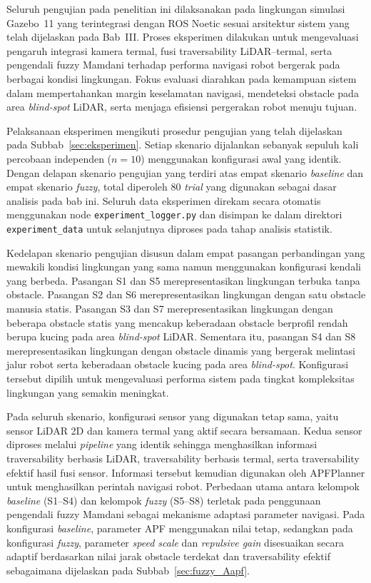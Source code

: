 Seluruh pengujian pada penelitian ini dilaksanakan pada lingkungan simulasi Gazebo~11 yang terintegrasi dengan ROS Noetic sesuai arsitektur sistem yang telah dijelaskan pada Bab~III. Proses eksperimen dilakukan untuk mengevaluasi pengaruh integrasi kamera termal, fusi trav\-ersability LiDAR--termal, serta pengendali fuzzy Mamdani terhadap performa navigasi robot bergerak pada berbagai kondisi lingkungan. Fokus evaluasi diarahkan pada kemampuan sistem dalam mempertahankan margin keselamatan navigasi, mendeteksi obstacle pada area \textit{blind-spot} LiDAR, serta menjaga efisiensi pergerakan robot menuju tujuan.

Pelaksanaan eksperimen mengikuti prosedur pengujian yang telah dijelaskan pada Subbab~\ref{sec:eksperimen}. Setiap skenario dijalankan sebanyak sepuluh kali percobaan independen ($n = 10$) menggunakan konfigurasi awal yang identik. Dengan delapan skenario pengujian yang terdiri atas empat skenario \textit{baseline} dan empat skenario \textit{fuzzy}, total diperoleh 80 \textit{trial} yang digunakan sebagai dasar analisis pada bab ini. Seluruh data eksperimen direkam secara otomatis menggunakan node \texttt{experiment\_logger.py} dan disimpan ke dalam direktori \texttt{experiment\_data} untuk selanjutnya diproses pada tahap analisis statistik.

Kedelapan skenario pengujian disusun dalam empat pasangan perbandingan yang mewakili kondisi lingkungan yang sama namun menggunakan konfigurasi kendali yang berbeda. Pas\-angan S1 dan S5 merepresentasikan lingkungan terbuka tanpa obstacle. Pasangan S2 dan S6 merepresentasikan lingkungan dengan satu obstacle manusia statis. Pasangan S3 dan S7 merepresentasikan lingkungan dengan beberapa obstacle statis yang mencakup keberadaan obstacle berprofil rendah berupa kucing pada area \textit{blind-spot} LiDAR. Sementara itu, pasangan S4 dan S8 merepresentasikan lingkungan dengan obstacle dinamis yang bergerak melintasi jalur robot serta keberadaan obstacle kucing pada area \textit{blind-spot}. Konfigurasi tersebut dipilih untuk mengevaluasi performa sistem pada tingkat kompleksitas lingkungan yang semakin meningkat.

Pada seluruh skenario, konfigurasi sensor yang digunakan tetap sama, yaitu sensor LiDAR 2D dan kamera termal yang aktif secara bersamaan. Kedua sensor diproses melalui \textit{pipeline} yang identik sehingga menghasilkan informasi traversability berbasis LiDAR, traversability berbasis termal, serta traversability efektif hasil fusi sensor. Informasi tersebut kemudian digunakan oleh APFPlanner untuk menghasilkan perintah navigasi robot. Perbedaan utama antara kelompok \textit{baseline} (S1--S4) dan kelompok \textit{fuzzy} (S5--S8) terletak pada penggunaan pengendali fuzzy Mamdani sebagai mekanisme adaptasi parameter navigasi. Pada konfigurasi \textit{baseline}, parameter APF menggunakan nilai tetap, sedangkan pada konfigurasi \textit{fuzzy}, parameter \textit{speed scale} dan \textit{repulsive gain} disesuaikan secara adaptif berdasarkan nilai jarak obstacle terdekat dan traversability efektif sebagaimana dijelaskan pada Subbab~\ref{sec:fuzzy_Aapf}.

